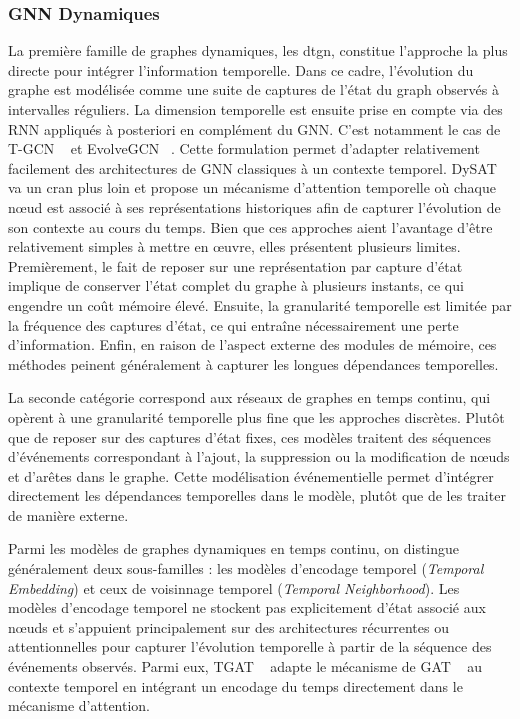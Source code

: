 \documentclass[a4paper,11pt,twoside]{StyleThese}
\begin{document}
\subsubsection{GNN Dynamiques}
La première famille de graphes dynamiques, les \gls{dtgn}, constitue l’approche la plus directe pour intégrer l’information temporelle. Dans ce cadre, l’évolution du graphe est modélisée comme une suite de captures de l'état du graph observés à intervalles réguliers. La dimension temporelle est ensuite prise en compte via des RNN appliqués à posteriori en complément du GNN. C’est notamment le cas de T-GCN ~\cite{tgcn} et EvolveGCN ~\cite{evolvegcn}. Cette formulation permet d’adapter relativement facilement des architectures de GNN classiques à un contexte temporel. DySAT ~\cite{dysat} va un cran plus loin et propose un mécanisme d’attention temporelle où chaque nœud est associé à ses représentations historiques afin de capturer l’évolution de son contexte au cours du temps. Bien que ces approches aient l'avantage d'être relativement simples à mettre en œuvre, elles présentent plusieurs limites. Premièrement, le fait de reposer sur une représentation par capture d’état implique de conserver l’état complet du graphe à plusieurs instants, ce qui engendre un coût mémoire élevé. Ensuite, la granularité temporelle est limitée par la fréquence des captures d’état, ce qui entraîne nécessairement une perte d’information. Enfin, en raison de l’aspect externe des modules de mémoire, ces méthodes peinent généralement à capturer les longues dépendances temporelles.

La seconde catégorie correspond aux réseaux de graphes en temps continu, qui opèrent à une granularité temporelle plus fine que les approches discrètes. Plutôt que de reposer sur des captures d'état fixes, ces modèles traitent des séquences d’événements correspondant à l’ajout, la suppression ou la modification de nœuds et d’arêtes dans le graphe. Cette modélisation événementielle permet d’intégrer directement les dépendances temporelles dans le modèle, plutôt que de les traiter de manière externe. 

Parmi les modèles de graphes dynamiques en temps continu, on distingue généralement deux sous-familles : les modèles d'encodage temporel (\textit{Temporal Embedding}) et ceux de voisinnage temporel (\textit{Temporal Neighborhood}). Les modèles d'encodage temporel ne stockent pas explicitement d’état associé aux nœuds et s’appuient principalement sur des architectures récurrentes ou attentionnelles pour capturer l’évolution temporelle à partir de la séquence des événements observés. Parmi eux, TGAT ~\cite{tgat} adapte le mécanisme de GAT ~\cite{gat} au contexte temporel en intégrant un encodage du temps directement dans le mécanisme d’attention. 
\end{document}

